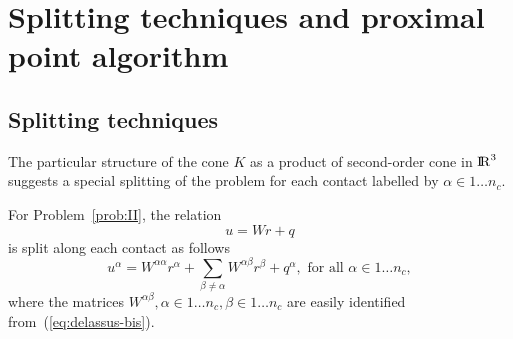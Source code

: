 \clearpage
\section{Splitting techniques and proximal point algorithm}
\label{Sec:SplittingTechniquesAndProx}

\subsection{Splitting techniques}
\label{Sec:SplittingTechniques}
 The particular structure of the cone $K$ as a product of second-order cone in $\mathrm{I\!R}^3$ suggests a special splitting of the problem for each contact labelled by $\alpha \in 1\ldots n_c$. 

For Problem~\ref{prob:II}, the relation
\begin{equation}
  \label{eq:delassus-bis}
  u = W r+q
\end{equation}
is split along each contact as follows
\begin{equation}
  \label{eq:delassus-ter}
  u^\alpha = W^{\alpha\alpha} r^\alpha + \sum_{\beta\neq \alpha}W^{\alpha\beta} r^\beta +  q^\alpha, \text{ for all } \alpha \in 1\ldots n_c,
\end{equation}
where the matrices $W^{\alpha\beta}, \alpha \in 1\ldots n_c, \beta \in 1\ldots n_c $ are easily identified from~(\ref{eq:delassus-bis}).
 
